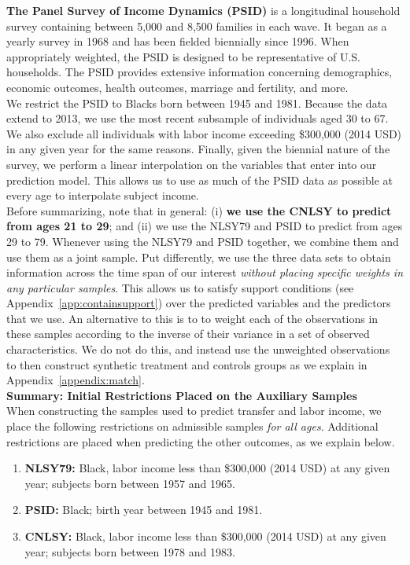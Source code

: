 \noindent\textbf{The Panel Survey of Income Dynamics (PSID)} is a longitudinal household survey containing between 5,000 and 8,500 families in each wave. It began as a yearly survey in 1968 and has been fielded biennially since 1996. When appropriately weighted, the PSID is designed to be representative of U.S. households. The PSID provides extensive information concerning demographics, economic outcomes, health outcomes, marriage and fertility, and more.\\

\noindent We restrict the PSID to Blacks born between 1945 and 1981. Because the data extend to 2013, we use the most recent subsample of individuals aged 30 to 67. We also exclude all individuals with labor income exceeding \$300,000 (2014 USD) in any given year for the same reasons. Finally, given the biennial nature of the survey, we perform a linear interpolation on the variables that enter into our prediction model. This allows us to use as much of the PSID data as possible at every age to interpolate subject income.\\

\noindent Before summarizing, note that in general: (i) \textbf{we use the CNLSY to predict from ages 21 to 29}; and (ii) we use the NLSY79 and PSID to predict from ages 29 to 79. Whenever using the NLSY79 and PSID together, we combine them and use them as a joint sample. Put differently, we use the three data sets to obtain information across the time span of our interest \textit{without placing specific weights in any particular samples}. This allows us to satisfy support conditions (see Appendix~\ref{app:containsupport}) over the predicted variables and the predictors that we use. An alternative to this is to to weight each of the observations in these samples according to the inverse of their variance in a set of observed characteristics. We do not do this, and instead use the unweighted observations to then construct synthetic treatment and controls groups as we explain in Appendix~\ref{appendix:match}.\\

\noindent \textbf{Summary: Initial Restrictions Placed on the Auxiliary Samples}\\
When constructing the samples used to predict transfer and labor income, we place the following restrictions on admissible samples \textit{for all ages}. Additional restrictions are placed when predicting the other outcomes, as we explain below.
\begin{enumerate}
\item \textbf{NLSY79:} Black, labor income less than \$300,000 (2014 USD) at any given year; subjects born between 1957 and 1965.
\item \textbf{PSID:} Black; birth year between 1945 and 1981.
\item \textbf{CNLSY:} Black, labor income less than \$300,000 (2014 USD) at any given year; subjects born between 1978 and 1983.
\end{enumerate}

